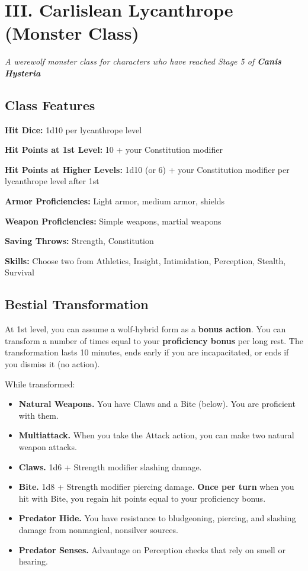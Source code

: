 \section{III. Carlislean Lycanthrope (Monster Class)}
\label{app:lycanthropy}
\textit{A werewolf monster class for characters who have reached Stage 5 of \textbf{Canis Hysteria}}

\subsection*{Class Features}
\textbf{Hit Dice:} 1d10 per lycanthrope level

\textbf{Hit Points at 1st Level:} 10 + your Constitution modifier

\textbf{Hit Points at Higher Levels:} 1d10 (or 6) + your Constitution modifier per lycanthrope level after 1st

\textbf{Armor Proficiencies:} Light armor, medium armor, shields

\textbf{Weapon Proficiencies:} Simple weapons, martial weapons

\textbf{Saving Throws:} Strength, Constitution

\textbf{Skills:} Choose two from Athletics, Insight, Intimidation, Perception, Stealth, Survival

\subsection*{Bestial Transformation}
At 1st level, you can assume a wolf-hybrid form as a \textbf{bonus action}. You can transform a number of times equal to your \textbf{proficiency bonus} per long rest. The transformation lasts 10 minutes, ends early if you are incapacitated, or ends if you dismiss it (no action).

While transformed:
\begin{itemize}
\item \textbf{Natural Weapons.} You have Claws and a Bite (below). You are proficient with them.
\item \textbf{Multiattack.} When you take the Attack action, you can make two natural weapon attacks.
\item \textbf{Claws.} 1d6 + Strength modifier slashing damage.
\item \textbf{Bite.} 1d8 + Strength modifier piercing damage. \textbf{Once per turn} when you hit with Bite, you regain hit points equal to your proficiency bonus.
\item \textbf{Predator Hide.} You have resistance to bludgeoning, piercing, and slashing damage from nonmagical, nonsilver sources.
\item \textbf{Predator Senses.} Advantage on Perception checks that rely on smell or hearing.
\end{itemize}

